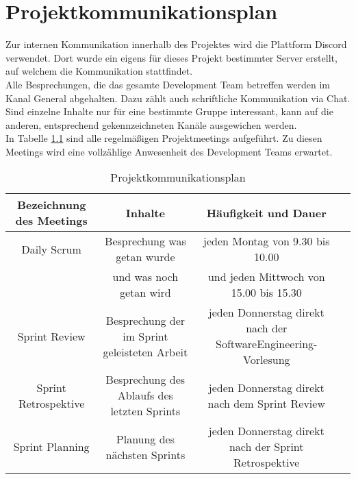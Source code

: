 \chapter{Projektkommunikationsplan}

Zur internen Kommunikation innerhalb des Projektes wird die Plattform Discord verwendet. Dort wurde ein eigens für dieses Projekt bestimmter Server erstellt, auf welchem die Kommunikation stattfindet. \\
Alle Besprechungen, die das gesamte \gls{Development Team} betreffen werden im Kanal \glqq General\grqq\: abgehalten. Dazu zählt auch schriftliche Kommunikation via Chat. \\
Sind einzelne Inhalte nur für eine bestimmte Gruppe interessant, kann auf die anderen, entsprechend gekennzeichneten Kanäle ausgewichen werden. \\
In Tabelle \ref{tab:Kommunikation} sind alle regelmäßigen Projektmeetings aufgeführt. Zu diesen Meetings wird eine vollzählige Anwesenheit des \gls{Development Team}s erwartet.

\begin{table}[h]
\centering
\tiny
\begin{tabular} [h] {|c|c|c|c|}
\hline
Bezeichnung des Meetings & Inhalte & Häufigkeit und Dauer \\
\hline
\gls{Daily Scrum} & Besprechung was getan wurde & jeden Montag von 9.30 bis 10.00\\
\quad & und was noch getan wird & und jeden Mittwoch von 15.00 bis 15.30 \\
\hline
\gls{Sprint Review} & Besprechung der im Sprint geleisteten Arbeit & jeden Donnerstag direkt nach der SoftwareEngineering-Vorlesung\\
\hline
\gls{Sprint Retrospektive} & Besprechung des Ablaufs des letzten Sprints & jeden Donnerstag direkt nach dem \gls{Sprint Review}\\
\hline
\gls{Sprint Planning} & Planung des nächsten Sprints & jeden Donnerstag direkt nach der \gls{Sprint Retrospektive}\\
\hline
\end{tabular}
\caption{Projektkommunikationsplan}
\label{tab:Kommunikation}
\end{table}
